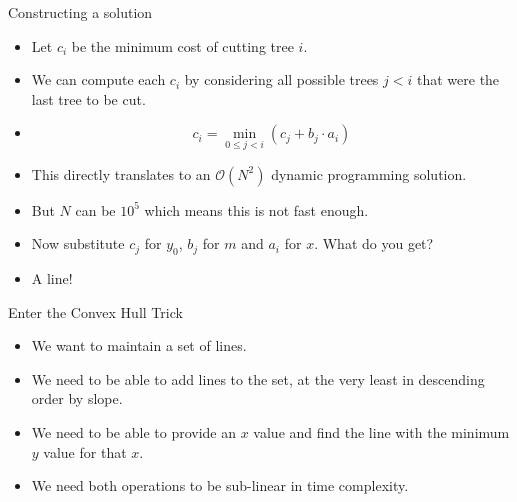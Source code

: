 \documentclass{beamer}
\begin{document}
\begin{frame}[plain]{Constructing a solution}
    \begin{itemize}
        \item<1-> Let $c_i$ be the minimum cost of cutting tree $i$.
        \item<2-> We can compute each $c_i$ by considering all possible trees $j < i$ that were the last tree to be cut.
        \item<3-> \[ c_i = \min_{0 \le j < i}\left( c_j + b_j \cdot a_i \right) \]
        \item<4-> This directly translates to an $\mathcal{O}\left(N^{2}\right)$ dynamic programming solution.
        \item<5-> But $N$ can be $10^5$ which means this is not fast enough.
        \item<6-> Now substitute $c_j$ for $y_0$, $b_j$ for $m$ and $a_i$ for $x$. What do you get?
        \item<7-> A line!
    \end{itemize}
\end{frame}

\begin{frame}[plain]{Enter the Convex Hull Trick}
    \begin{itemize}
        \item<1-> We want to maintain a set of lines.
        \item<2-> We need to be able to add lines to the set, at the very least in descending order by slope.
        \item<3-> We need to be able to provide an $x$ value and find the line with the minimum $y$ value for that $x$.
        \item<4-> We need both operations to be sub-linear in time complexity.
    \end{itemize}
\end{frame}
\end{document}
